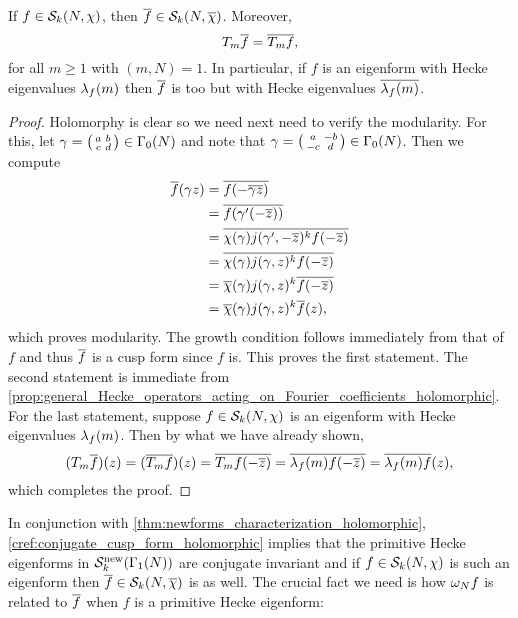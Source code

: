     \begin{proposition}\label{cref:conjugate_cusp_form_holomorphic}
      If $f \in \mathcal{S}_{k}(N,\chi)$, then $\overline{f} \in \mathcal{S}_{k}(N,\overline{\chi})$. Moreover,
      \[
        T_{m}\overline{f} = \overline{T_{m}f},
      \]
      for all $m \ge 1$ with $(m,N) = 1$. In particular, if $f$ is an eigenform with Hecke eigenvalues $\lambda_{f}(m)$ then $\overline{f}$ is too but with Hecke eigenvalues $\overline{\lambda_{f}(m)}$.
    \end{proposition}
    \begin{proof}
      Holomorphy is clear so we need next need to verify the modularity. For this, let $\gamma = \begin{psmallmatrix} a & b \\ c & d \end{psmallmatrix} \in \Gamma_{0}(N)$ and note that $\gamma = \begin{psmallmatrix} a & -b \\ -c & d \end{psmallmatrix} \in \Gamma_{0}(N)$. Then we compute
      \begin{align*}
        \overline{f}(\gamma z) &= \overline{f(-\overline{\gamma z})} \\
        &= \overline{f(\gamma'(-\overline{z}))} \\
        &= \overline{\chi(\gamma)j(\gamma',-\overline{z})^{k}f(-\overline{z})} \\
        &= \overline{\chi(\gamma)j(\gamma,z)^{k}f(-\overline{z})} \\
        &= \overline{\chi}(\gamma)j(\gamma,z)^{k}\overline{f(-\overline{z})} \\
        &= \overline{\chi}(\gamma)j(\gamma,z)^{k}\overline{f}(z),
      \end{align*}
      which proves modularity. The growth condition follows immediately from that of $f$ and thus $\overline{f}$ is a cusp form since $f$ is. This proves the first statement. The second statement is immediate from \cref{prop:general_Hecke_operators_acting_on_Fourier_coefficients_holomorphic}. For the last statement, suppose $f \in \mathcal{S}_{k}(N,\chi)$ is an eigenform with Hecke eigenvalues $\lambda_{f}(m)$. Then by what we have already shown,
      \[
        (T_{m}\overline{f})(z) = (\overline{T_{m}f})(z) = \overline{T_{m}f(-\overline{z})} = \overline{\lambda_{f}(m)f(-\overline{z})} = \overline{\lambda_{f}(m)f}(z),
      \]
      which completes the proof.
    \end{proof}
    
    In conjunction with \cref{thm:newforms_characterization_holomorphic}, \cref{cref:conjugate_cusp_form_holomorphic} implies that the primitive Hecke eigenforms in $\mathcal{S}_{k}^{\mathrm{new}}(\Gamma_{1}(N))$ are conjugate invariant and if $f \in \mathcal{S}_{k}(N,\chi)$ is such an eigenform then $\overline{f} \in \mathcal{S}_{k}(N,\overline{\chi})$ is as well. The crucial fact we need is how $\omega_{N}f$ is related to $\overline{f}$ when $f$ is a primitive Hecke eigenform:

